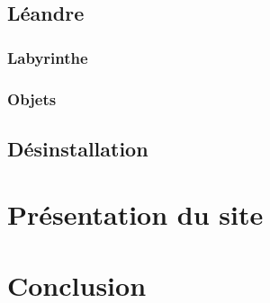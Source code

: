 \documentclass{article}
\begin{document}
\subsection{Léandre}
\subsubsection{Labyrinthe}
\subsubsection{Objets}

\subsection{Désinstallation}

\section{Présentation du site}

\section{Conclusion}
\end{document}
